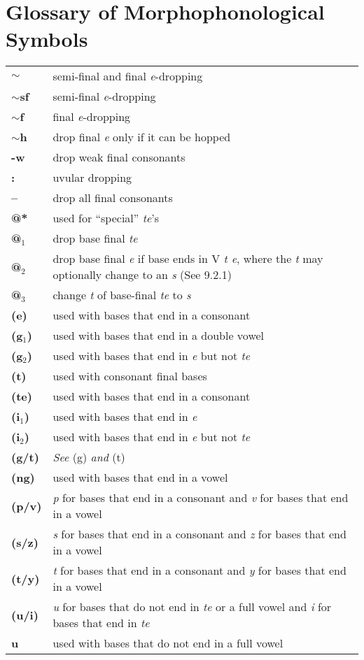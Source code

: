 \documentclass{article}
\begin{document}
\section{Glossary of Morphophonological Symbols}

\begin{tabular}{l l}

\textbf{$\sim$} & semi-final and final \textit{e}-dropping \\
\textbf{$\sim$sf} & semi-final \textit{e}-dropping \\
\textbf{$\sim$f} & final \textit{e}-dropping \\
\textbf{$\sim$h} & drop final \textit{e} only if it can be hopped \\
\textbf{-w} & drop weak final consonants \\
\textbf{:} & uvular dropping \\
\textbf{--} & drop all final consonants \\
\textbf{@*} & used for ``special'' \textit{te}'s \\
\textbf{@$_\text{1}$} & drop base final \textit{te} \\
\textbf{@$_\text{2}$} & drop base final \textit{e} if base ends in V \textit{t e}, where the \textit{t} may optionally change to an \textit{s} (See 9.2.1) \\
\textbf{@$_\text{3}$} & change \textit{t} of base-final \textit{te} to \textit{s} \\ 
\textbf{(e)} & used with bases that end in a consonant \\
\textbf{(g$_\text{1}$)} & used with bases that end in a double vowel \\
\textbf{(g$_\text{2}$)} & used with bases that end in \textit{e} but not \textit{te} \\
\textbf{(t)} & used with consonant final bases \\
\textbf{(te)} & used with bases that end in a consonant \\
\textbf{(i$_\text{1}$)} & used with bases that end in \textit{e} \\
\textbf{(i$_\text{2}$)} & used with bases that end in \textit{e} but not \textit{te} \\
\textbf{(g/t)} & \textit{See} (g) \textit{and} (t) \\
\textbf{(ng)} & used with bases that end in a vowel \\
\textbf{(p/v)} & \textit{p} for bases that end in a consonant and \textit{v} for bases that end in a vowel \\
\textbf{(s/z)} & \textit{s} for bases that end in a consonant and \textit{z} for bases that end in a vowel \\
\textbf{(t/y)} & \textit{t} for bases that end in a consonant and \textit{y} for bases that end in a vowel \\
\textbf{(u/i)} & \textit{u} for bases that do not end in \textit{te} or a full vowel and \textit{i} for bases that end in \textit{te} \\
\textbf{u} & used with bases that do not end in a full vowel \\

\end{tabular}
\end{document}
